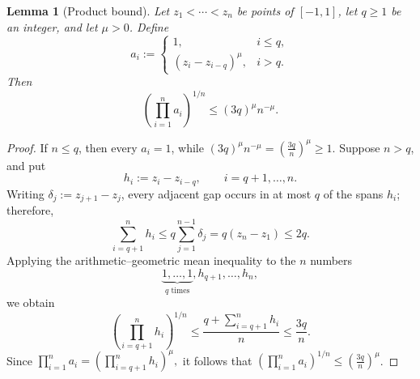 \documentclass[11pt]{article}
\newtheorem{lemma}[lemma]{Lemma}
\theoremstyle{definition}
\theoremstyle{remark}
\begin{document}
\begin{lemma}[Product bound]
\label{lem:consecutive-span-product}
Let $z_1<\cdots<z_n$ be points of $[-1, 1]$, let $q\ge1$
be an integer, and let $\mu>0$. Define
\[
    a_i:=
    \begin{cases}
      1,&i\le q,\\
      (z_i-z_{i-q})^\mu,&i>q.
    \end{cases}
\]
Then
\begin{equation*}
    \left(\prod_{i=1}^n a_i\right)^{1/n}
    \le
    (3q)^\mu n^{-\mu}.
\end{equation*}
\end{lemma}

\begin{proof}
If $n\le q$, then every $a_i=1$, while
$
    (3q)^\mu n^{-\mu}
    =
    \left(\frac{3q}{n}\right)^\mu
    \ge1.
$
Suppose $n>q$, and put
\[
    h_i:=z_i-z_{i-q},
    \qquad i=q+1,\ldots,n.
\]
Writing $\delta_j:=z_{j+1}-z_j$, every adjacent gap occurs in at most $q$
of the spans $h_i$; therefore,
\[
    \sum_{i=q+1}^n h_i
    \le
    q\sum_{j=1}^{n-1}\delta_j
    =
    q(z_n-z_1)
    \le
    2q.
\]
Applying the arithmetic--geometric mean inequality to the $n$ numbers
\[
    \underbrace{1,\ldots,1}_{q\text{ times}},
    h_{q+1},\ldots,h_n,
\]
we obtain
\[
    \left(\prod_{i=q+1}^n h_i\right)^{1/n}
    \le
    \frac{q+\sum_{i=q+1}^n h_i}{n}
    \le
    \frac{3q}{n}.
\]
Since $
    \prod_{i=1}^n a_i
    =
    \left(\prod_{i=q+1}^n h_i\right)^\mu,$
it follows that $
    \left(\prod_{i=1}^n a_i\right)^{1/n}
    \le
    \left(\frac{3q}{n}\right)^\mu
$.
\end{proof}
\end{document}
